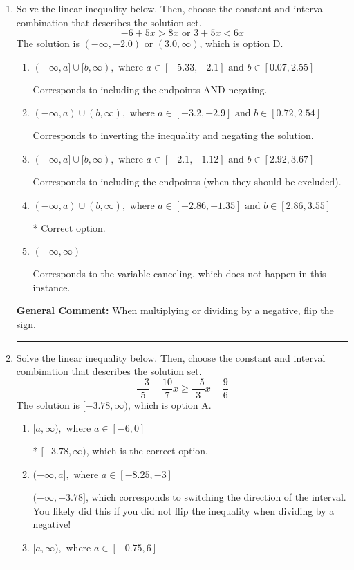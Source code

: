 \documentclass{extbook}[14pt]
\newcommand{\litem}[1]{\item #1

\rule{\textwidth}{0.4pt}}
\begin{document}
\begin{enumerate}\litem{
Solve the linear inequality below. Then, choose the constant and interval combination that describes the solution set.
\[ -6 + 5 x > 8 x \text{ or } 3 + 5 x < 6 x \]The solution is \( (-\infty, -2.0) \text{ or } (3.0, \infty) \), which is option D.\begin{enumerate}[label=\Alph*.]
\item \( (-\infty, a] \cup [b, \infty), \text{ where } a \in [-5.33, -2.1] \text{ and } b \in [0.07, 2.55] \)

Corresponds to including the endpoints AND negating.
\item \( (-\infty, a) \cup (b, \infty), \text{ where } a \in [-3.2, -2.9] \text{ and } b \in [0.72, 2.54] \)

Corresponds to inverting the inequality and negating the solution.
\item \( (-\infty, a] \cup [b, \infty), \text{ where } a \in [-2.1, -1.12] \text{ and } b \in [2.92, 3.67] \)

Corresponds to including the endpoints (when they should be excluded).
\item \( (-\infty, a) \cup (b, \infty), \text{ where } a \in [-2.86, -1.35] \text{ and } b \in [2.86, 3.55] \)

 * Correct option.
\item \( (-\infty, \infty) \)

Corresponds to the variable canceling, which does not happen in this instance.
\end{enumerate}

\textbf{General Comment:} When multiplying or dividing by a negative, flip the sign.
}
\litem{
Solve the linear inequality below. Then, choose the constant and interval combination that describes the solution set.
\[ \frac{-3}{5} - \frac{10}{7} x \geq \frac{-5}{3} x - \frac{9}{6} \]The solution is \( [-3.78, \infty) \), which is option A.\begin{enumerate}[label=\Alph*.]
\item \( [a, \infty), \text{ where } a \in [-6, 0] \)

* $[-3.78, \infty)$, which is the correct option.
\item \( (-\infty, a], \text{ where } a \in [-8.25, -3] \)

 $(-\infty, -3.78]$, which corresponds to switching the direction of the interval. You likely did this if you did not flip the inequality when dividing by a negative!
\item \( [a, \infty), \text{ where } a \in [-0.75, 6] \)


\end{enumerate}}
\end{enumerate}
\end{document}
